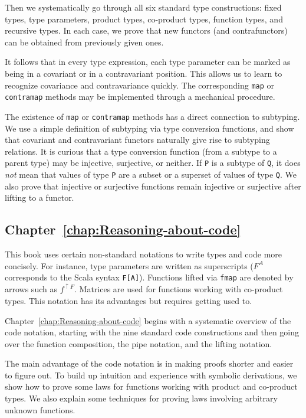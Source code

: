 Then we systematically go through all six standard type constructions:
fixed types, type parameters, product types, co-product types, function
types, and recursive types. In each case, we prove that new functors
(and contrafunctors) can be obtained from previously given ones. 

It follows that in every type expression, each type parameter can
be marked as being in a covariant or in a contravariant position.
This allows us to learn to recognize covariance and contravariance
quickly. The corresponding \lstinline!map! or \lstinline!contramap!
methods may be implemented through a mechanical procedure.

The existence of \lstinline!map! or \lstinline!contramap! methods
has a direct connection to subtyping. We use a simple definition of
subtyping via type conversion functions, and show that covariant and
contravariant functors naturally give rise to subtyping relations.
It is curious that a type conversion function (from a subtype to a
parent type) may be injective, surjective, or neither. If \lstinline!P!
is a subtype of \lstinline!Q!, it does \emph{not} mean that values
of type \lstinline!P! are a subset or a superset of values of type
\lstinline!Q!. We also prove that injective or surjective functions
remain injective or surjective after lifting to a functor. 

\subsection{Chapter~\ref{chap:Reasoning-about-code}}

This book uses certain non-standard notations to write types and code
more concisely. For instance, type parameters are written as superscripts
($F^{A}$ corresponds to the Scala syntax \lstinline!F[A]!). Functions
lifted via \lstinline!fmap! are denoted by arrows such as $f^{\uparrow F}$.
Matrices are used for functions working with co-product types. This
notation has its advantages but requires getting used to.

Chapter~\ref{chap:Reasoning-about-code} begins with a systematic
overview of the code notation, starting with the nine standard code
constructions and then going over the function composition, the pipe
notation, and the lifting notation. 

The main advantage of the code notation is in making proofs shorter
and easier to figure out. To build up intuition and experience with
symbolic derivations, we show how to prove some laws for functions
working with product and co-product types. We also explain some techniques
for proving laws involving arbitrary unknown functions.


